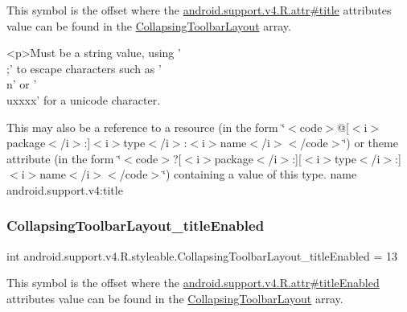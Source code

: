 This symbol is the offset where the \hyperlink{classandroid_1_1support_1_1v4_1_1R_1_1attr_aaa11a7e1e11d0e32f6bae3e8951a2fb8}{android.\+support.\+v4.\+R.\+attr\#title} attribute\textquotesingle{}s value can be found in the \hyperlink{classandroid_1_1support_1_1v4_1_1R_1_1styleable_a91b20e27088c910353d38c1efde32aa9}{Collapsing\+Toolbar\+Layout} array.

\begin{DoxyVerb}      <p>Must be a string value, using '\\;' to escape characters such as '\\n' or '\\uxxxx' for a unicode character.
\end{DoxyVerb}
 

This may also be a reference to a resource (in the form \char`\"{}$<$code$>$@\mbox{[}$<$i$>$package$<$/i$>$\+:\mbox{]}$<$i$>$type$<$/i$>$\+:$<$i$>$name$<$/i$>$$<$/code$>$\char`\"{}) or theme attribute (in the form \char`\"{}$<$code$>$?\mbox{[}$<$i$>$package$<$/i$>$\+:\mbox{]}\mbox{[}$<$i$>$type$<$/i$>$\+:\mbox{]}$<$i$>$name$<$/i$>$$<$/code$>$\char`\"{}) containing a value of this type.  name android.\+support.\+v4\+:title \mbox{\label{classandroid_1_1support_1_1v4_1_1R_1_1styleable_ac4319599b3c76f2446ebe9536abeba56}} 
\subsubsection{\texorpdfstring{Collapsing\+Toolbar\+Layout\+\_\+title\+Enabled}{CollapsingToolbarLayout\_titleEnabled}}
{\footnotesize\ttfamily int android.\+support.\+v4.\+R.\+styleable.\+Collapsing\+Toolbar\+Layout\+\_\+title\+Enabled = 13\hspace{0.3cm}{\ttfamily [static]}}

This symbol is the offset where the \hyperlink{classandroid_1_1support_1_1v4_1_1R_1_1attr_aa20397e6dba2afdfdd19964ccafba0f7}{android.\+support.\+v4.\+R.\+attr\#title\+Enabled} attribute\textquotesingle{}s value can be found in the \hyperlink{classandroid_1_1support_1_1v4_1_1R_1_1styleable_a91b20e27088c910353d38c1efde32aa9}{Collapsing\+Toolbar\+Layout} array.

